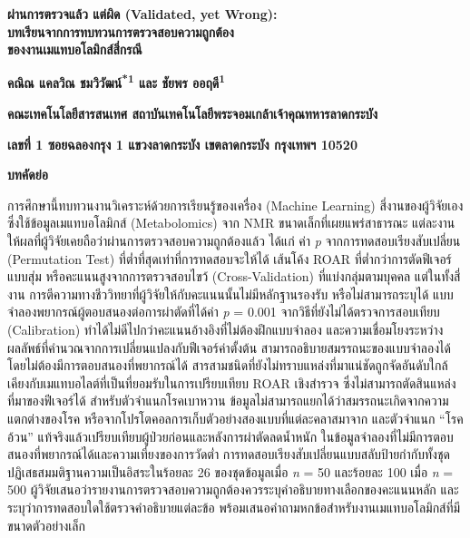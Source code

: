 \documentclass[11pt,a4paper]{article}
\begin{document}
\begin{center}
{\Large\bfseries ผ่านการตรวจแล้ว แต่ผิด (Validated, yet Wrong):\\[0.2em]
บทเรียนจากการทบทวนการตรวจสอบความถูกต้อง\\[0.2em]
ของงานเมแทบอโลมิกส์สี่กรณี\par}
\vspace{1.2em}
{\bfseries คณิณ แคลวิณ ชมวิวัฒน์\textsuperscript{*1} และ ชัยพร ออฤดี\textsuperscript{1}\par}
\vspace{0.6em}
{\bfseries คณะเทคโนโลยีสารสนเทศ สถาบันเทคโนโลยีพระจอมเกล้าเจ้าคุณทหารลาดกระบัง\par}
\vspace{0.4em}
{\bfseries เลขที่ 1 ซอยฉลองกรุง 1 แขวงลาดกระบัง เขตลาดกระบัง กรุงเทพฯ 10520\par}
\end{center}

\vspace{1.5em}
\noindent\textbf{บทคัดย่อ}

การศึกษานี้ทบทวนงานวิเคราะห์ด้วยการเรียนรู้ของเครื่อง (Machine Learning)
สี่งานของผู้วิจัยเอง ซึ่งใช้ข้อมูลเมแทบอโลมิกส์ (Metabolomics) จาก NMR
ขนาดเล็กที่เผยแพร่สาธารณะ แต่ละงานให้ผลที่ผู้วิจัยเคยถือว่าผ่านการตรวจสอบความถูกต้องแล้ว
ได้แก่ ค่า \textit{p} จากการทดสอบเรียงสับเปลี่ยน (Permutation Test)
ที่ต่ำที่สุดเท่าที่การทดสอบจะให้ได้ เส้นโค้ง ROAR ที่ต่ำกว่าการตัดฟีเจอร์แบบสุ่ม
หรือคะแนนสูงจากการตรวจสอบไขว้ (Cross-Validation) ที่แบ่งกลุ่มตามบุคคล
แต่ในทั้งสี่งาน การตีความทางชีววิทยาที่ผู้วิจัยให้กับคะแนนนั้นไม่มีหลักฐานรองรับ
หรือไม่สามารถระบุได้
แบบจำลองพยากรณ์ผู้ตอบสนองต่อการผ่าตัดที่ได้ค่า \textit{p} = 0.001
จากวิธีที่ยังไม่ได้ตรวจการสอบเทียบ (Calibration)
ทำได้ไม่ดีไปกว่าคะแนนอ้างอิงที่ไม่ต้องฝึกแบบจำลอง และความเชื่อมโยงระหว่างผลลัพธ์ที่คำนวณจากการเปลี่ยนแปลงกับฟีเจอร์ค่าตั้งต้น
สามารถอธิบายสมรรถนะของแบบจำลองได้โดยไม่ต้องมีการตอบสนองที่พยากรณ์ได้
สารสามชนิดที่ยังไม่ทราบแหล่งที่มาแน่ชัดถูกจัดอันดับใกล้เคียงกับเมแทบอไลต์ที่เป็นที่ยอมรับในการเปรียบเทียบ
ROAR เชิงสำรวจ ซึ่งไม่สามารถตัดสินแหล่งที่มาของฟีเจอร์ได้
สำหรับตัวจำแนกโรคเบาหวาน ข้อมูลไม่สามารถแยกได้ว่าสมรรถนะเกิดจากความแตกต่างของโรค
หรือจากโปรโตคอลการเก็บตัวอย่างสองแบบที่แต่ละคลาสมาจาก และตัวจำแนก ``โรคอ้วน'' แท้จริงแล้วเปรียบเทียบผู้ป่วยก่อนและหลังการผ่าตัดลดน้ำหนัก
ในข้อมูลจำลองที่ไม่มีการตอบสนองที่พยากรณ์ได้และความเที่ยงของการวัดต่ำ
การทดสอบเรียงสับเปลี่ยนแบบสลับป้ายกำกับทั้งชุดปฏิเสธสมมติฐานความเป็นอิสระในร้อยละ 26
ของชุดข้อมูลเมื่อ \textit{n} = 50 และร้อยละ 100 เมื่อ \textit{n} = 500
ผู้วิจัยเสนอว่ารายงานการตรวจสอบความถูกต้องควรระบุคำอธิบายทางเลือกของคะแนนหลัก
และระบุว่าการทดสอบใดใช้ตรวจคำอธิบายแต่ละข้อ
พร้อมเสนอคำถามหกข้อสำหรับงานเมแทบอโลมิกส์ที่มีขนาดตัวอย่างเล็ก
\end{document}
